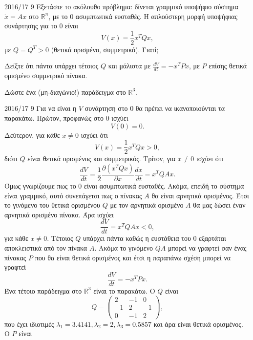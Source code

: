 \begin{exercise}{2016/17 9}
    Εξετάστε το ακόλουθο πρόβλημα: δίνεται γραμμικό υποψήφιο σύστημα
    \( \dot{x} = Ax \) στο \( \mathbb{R}^n \), με το \( 0 \) ασυμπτωτικά
    ευσταθές. Η απλούστερη μορφή υποψήφιας συνάρτησης  για το \( 0
    \) είναι
    \[
        V(x) = \frac{1}{2}x^{T}Qx,
    \]
    με \( Q = Q^T > 0 \) (θετικά ορισμένο, συμμετρικό). Γιατί;

    Δείξτε ότι πάντα υπάρχει τέτοιος \( Q \) και μάλιστα με \( \frac{dV}{dt} =
    -x^{T}Px \), με \( P \) επίσης θετικά ορισμένο συμμετρικό πίνακα.

    Δώστε ένα (μη-διαγώνιο!) παράδειγμα στο \( \mathbb{R}^3 \).
\end{exercise}
\begin{solution}{2016/17 9}
    Για να είναι η \( V \) συνάρτηση  στο \( 0 \) θα πρέπει να
    ικανοποιούνται τα παρακάτω. Πρώτον, προφανώς στο \( 0 \) ισχύει
    \[
        V(0) = 0.
    \]
    Δεύτερον, για κάθε \( x \neq 0 \) ισχύει ότι
    \[
        V(x) = \frac{1}{2}x^{T}Qx > 0,
    \]
    διότι \( Q \) είναι θετικά ορισμένος και συμμετρικός. Τρίτον, για \( x \neq
    0 \) ισχύει ότι
    \[
        \frac{dV}{dt} = \frac{1}{2}
        \frac{\partial \left( x^{T}Qx \right)}{\partial x}
        \frac{dx}{dt} =
        x^{T}QAx.
    \]
    Όμως γνωρίζουμε πως το \( 0 \) είναι ασυμπτωτικά ευσταθές. Ακόμα, επειδή το
    σύστημα είναι γραμμικό, αυτό συνεπάγεται πως ο πίνακας \( A \) θα είναι
    αρνητικά ορισμένος. Έτσι το γινόμενο του θετικά ορισμένου \( Q \) με τον
    αρνητικά ορισμένο \( A \) θα μας δώσει έναν αρνητικά ορισμένο πίνακα.
    Άρα ισχύει
    \[
        \frac{dV}{dt} = x^{T}QAx < 0,
    \]
    για κάθε \( x \neq 0 \). Τέτοιος \( Q \) υπάρχει πάντα καθώς η ευστάθεια του
    \( 0 \) εξαρτάται αποκλειστικά από τον πίνακα \( A \). Ακόμα το γινόμενο
    \( QA \) μπορεί να γραφτεί σαν ένας πίνακας \( P \) που θα είναι θετικά
    ορισμένος και έτσι η παραπάνω σχέση μπορεί να γραφτεί
    \[
        \frac{dV}{dt} = -x^{T}Px.
    \]
    Ένα τέτοιο παράδειγμα στο \( \mathbb{R}^3 \) είναι το παρακάτω. Ο \( Q \)
    είναι
    \[
        Q =
        \begin{pmatrix}
            2 & -1 & 0 \\
            -1 & 2 & -1 \\
            0 & -1 & 2
        \end{pmatrix},
    \]
    που έχει ιδιοτιμές \( \lambda_1 = 3.4141, \lambda_2 = 2, \lambda_3 = 0.5857
    \) και άρα είναι θετικά ορισμένος. Ο \( P \) είναι

\end{solution}
